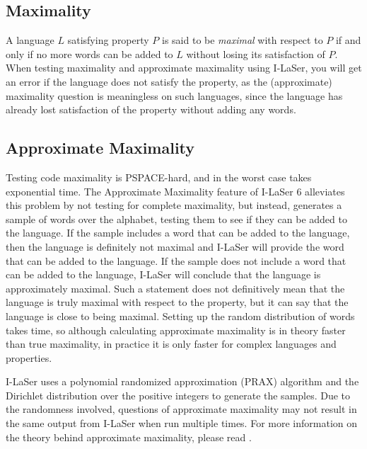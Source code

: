 \documentclass{article}
\begin{document}
\subsection{Maximality}
\par A language $L$ satisfying property $P$ is said to be \textit{maximal} with respect to $P$ if and only if no more words can be added to $L$ without losing its satisfaction of $P$. When testing maximality and approximate maximality using I-LaSer, you will get an error if the language does not satisfy the property, as the (approximate) maximality question is meaningless on such languages, since the language has already lost satisfaction of the property without adding any words. 

\subsection{Approximate Maximality}
\par Testing code maximality is PSPACE-hard, and in the worst case takes exponential time.\cite{Approx}
The Approximate Maximality feature of I-LaSer 6 alleviates this problem by not testing for complete maximality, but instead, generates a sample of words over the alphabet, testing them to see if they can be added to the language.
If the sample includes a word that can be added to the language, then the language is definitely not maximal and I-LaSer will provide the word that can be added to the language.
If the sample does not include a word that can be added to the language, I-LaSer will conclude that the language is approximately maximal.
Such a statement does not definitively mean that the language is truly maximal with respect to the property, but it can say that the language is close to being maximal.
Setting up the random distribution of words takes time, so although calculating approximate maximality is in theory faster than true maximality, in practice it is only faster for complex languages and properties. 

\par I-LaSer uses a polynomial randomized approximation (PRAX) algorithm and the Dirichlet distribution over the positive integers to generate the samples. Due to the randomness involved, questions of approximate maximality may not result in the same output from I-LaSer when run multiple times. For more information on the theory behind approximate maximality, please read \cite{Approx}.

\end{document}
